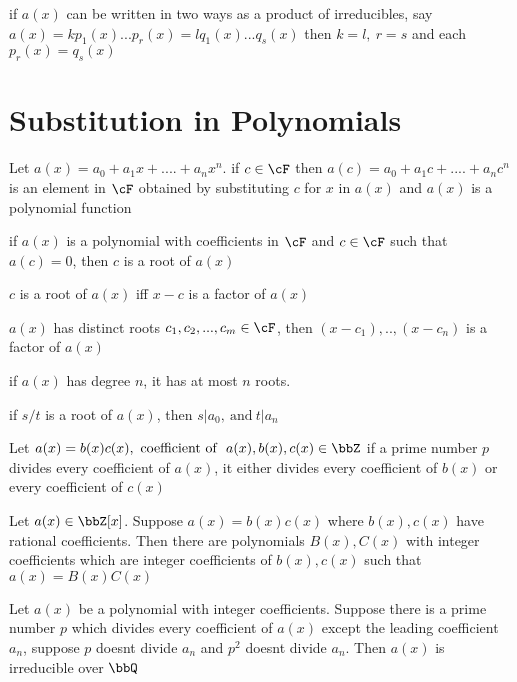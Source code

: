 \documentclass[11pt, oneside, dvipdfmx]{book}
\begin{document}
\begin{MyTheorem}
if $a(x)$ can be written in two ways as a product of irreducibles, say $a(x)=kp_1(x)...p_r(x) =lq_1(x)...q_s(x)$ then $k=l,~r=s$ and each $p_r(x)=q_s(x)$
\end{MyTheorem}

\section{Substitution in Polynomials}
Let $a(x)=a_0 +a_1x+....+a_nx^n$. if $c \in \cF$ then $a(c)=a_0 +a_1c+....+a_nc^n$ is an element in $\cF$ obtained by substituting $c$ for $x$ in $a(x)$ and $a(x)$ is a polynomial function

if $a(x)$ is a polynomial with coefficients in $\cF$ and $c \in \cF$ such that $a(c)=0$, then $c$ is a root of $a(x)$

\begin{MyTheorem}
$c$ is a root of $a(x)$ iff $x-c$ is a factor of $a(x)$
\end{MyTheorem}

\begin{MyTheorem}
$a(x)$ has distinct roots $c_1,c_2,...,c_m \in \cF$, then $(x-c_1),..,(x-c_n)$ is a factor of $a(x)$
\end{MyTheorem}

\begin{MyTheorem}
if $a(x)$ has degree $n$, it has at most $n$ roots.
\end{MyTheorem}

\begin{MyTheorem}
if $s/t$ is a root of $a(x)$, then $s|a_0,~\text{and}~t|a_n$
\end{MyTheorem}

\begin{Lemma}
Let $a(x)=b(x)c(x),~\text{coefficient of }~a(x),b(x),c(x) \in \bbZ$
if a prime number $p$ divides every coefficient of $a(x)$, it either divides every coefficient of $b(x)$ or every coefficient of $c(x)$
\end{Lemma}

\begin{MyTheorem}
Let $a(x) \in \bbZ[x]$. Suppose $a(x)=b(x)c(x)$ where $b(x),c(x)$ have rational coefficients. Then there are polynomials $B(x),C(x)$ with integer coefficients which are integer coefficients of $b(x),c(x)$ such that $a(x)=B(x)C(x)$
\end{MyTheorem}

\begin{MyTheorem}
Let $a(x)$ be a polynomial with integer coefficients. Suppose there is a prime number $p$ which divides every coefficient of $a(x)$ except the leading coefficient $a_n$, suppose $p$ doesnt divide $a_n$ and  $p^2$ doesnt divide $a_n$. Then $a(x)$ is irreducible over $\bbQ$
\end{MyTheorem}
\end{document}
